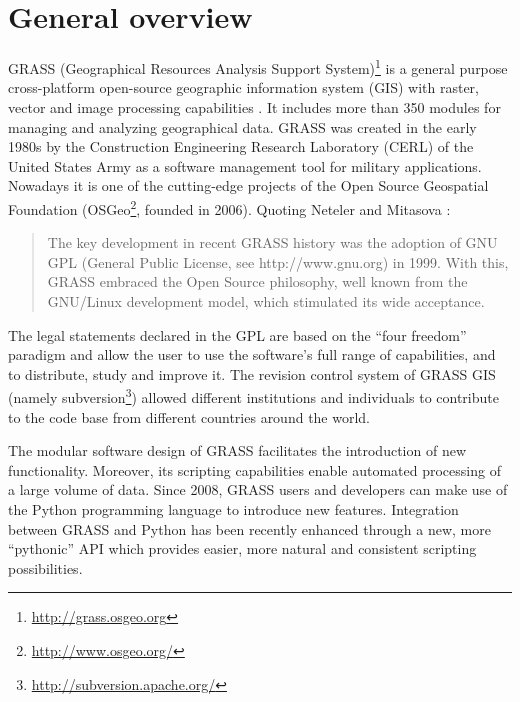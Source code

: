 \documentclass[a4paper,12pt,oneside]{book}
\begin{document}
\section{General overview}
\label{sec:grassoverview}
GRASS  (Geographical Resources Analysis Support System)\footnote{\url{http://grass.osgeo.org}}
is a general purpose cross-platform open-source geographic information system (GIS)
with raster, vector and image processing capabilities \cite{neteler2011grass}.
It includes more than 350 modules for managing and analyzing geographical data.
GRASS was created in the early 1980s by the Construction Engineering Research Laboratory (CERL)
of the United States Army as a software management tool for military applications.
Nowadays it is one of the cutting-edge projects of the Open Source Geospatial Foundation
(OSGeo\footnote{\url{http://www.osgeo.org/}}, founded in 2006).
Quoting Neteler and Mitasova \cite[p.~3]{grassGisApproach}:

\begin{quote}
The key development in recent GRASS history was the adoption of GNU GPL
(General Public License, see http://www.gnu.org) in 1999.
With this, GRASS embraced the Open Source philosophy,
well known from the GNU/Linux development model, which stimulated its wide acceptance.
\end{quote}

The legal statements declared in the GPL are based on the ``four freedom'' paradigm \cite{stallman1985gnu}
and allow the user to use the software’s full range of capabilities, and to distribute, study and improve it.
The revision control system of GRASS GIS (namely subversion\footnote{\url{http://subversion.apache.org/}})
allowed different institutions and individuals to contribute to the code base
from different countries around the world.

The modular software design of GRASS facilitates the introduction of new functionality.
Moreover, its scripting capabilities enable automated processing of a large volume of data.
Since 2008, GRASS users and developers can make use of the Python programming language \cite{van1995python}
to introduce new features. Integration between GRASS and Python has been recently enhanced through a new,
more ``pythonic'' API \cite{pygrass} which provides easier, more natural and consistent scripting possibilities.
\end{document}
